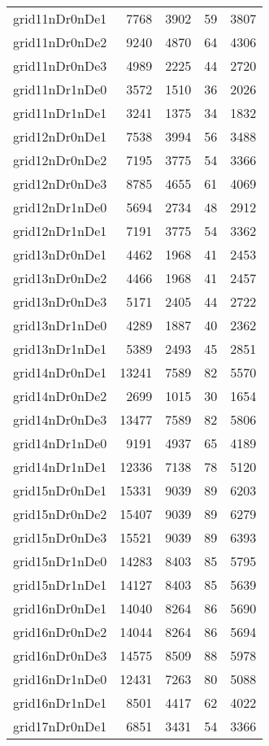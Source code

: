 \documentclass[../../../thesis.tex]{subfiles}
\begin{document}
\begin{longtable}{lrrrr}
grid11nDr0nDe1 & 7768 & 3902 & 59 & 3807 \\
grid11nDr0nDe2 & 9240 & 4870 & 64 & 4306 \\
grid11nDr0nDe3 & 4989 & 2225 & 44 & 2720 \\
grid11nDr1nDe0 & 3572 & 1510 & 36 & 2026 \\
grid11nDr1nDe1 & 3241 & 1375 & 34 & 1832 \\
grid12nDr0nDe1 & 7538 & 3994 & 56 & 3488 \\
grid12nDr0nDe2 & 7195 & 3775 & 54 & 3366 \\
grid12nDr0nDe3 & 8785 & 4655 & 61 & 4069 \\
grid12nDr1nDe0 & 5694 & 2734 & 48 & 2912 \\
grid12nDr1nDe1 & 7191 & 3775 & 54 & 3362 \\
grid13nDr0nDe1 & 4462 & 1968 & 41 & 2453 \\
grid13nDr0nDe2 & 4466 & 1968 & 41 & 2457 \\
grid13nDr0nDe3 & 5171 & 2405 & 44 & 2722 \\
grid13nDr1nDe0 & 4289 & 1887 & 40 & 2362 \\
grid13nDr1nDe1 & 5389 & 2493 & 45 & 2851 \\
grid14nDr0nDe1 & 13241 & 7589 & 82 & 5570 \\
grid14nDr0nDe2 & 2699 & 1015 & 30 & 1654 \\
grid14nDr0nDe3 & 13477 & 7589 & 82 & 5806 \\
grid14nDr1nDe0 & 9191 & 4937 & 65 & 4189 \\
grid14nDr1nDe1 & 12336 & 7138 & 78 & 5120 \\
grid15nDr0nDe1 & 15331 & 9039 & 89 & 6203 \\
grid15nDr0nDe2 & 15407 & 9039 & 89 & 6279 \\
grid15nDr0nDe3 & 15521 & 9039 & 89 & 6393 \\
grid15nDr1nDe0 & 14283 & 8403 & 85 & 5795 \\
grid15nDr1nDe1 & 14127 & 8403 & 85 & 5639 \\
grid16nDr0nDe1 & 14040 & 8264 & 86 & 5690 \\
grid16nDr0nDe2 & 14044 & 8264 & 86 & 5694 \\
grid16nDr0nDe3 & 14575 & 8509 & 88 & 5978 \\
grid16nDr1nDe0 & 12431 & 7263 & 80 & 5088 \\
grid16nDr1nDe1 & 8501 & 4417 & 62 & 4022 \\
grid17nDr0nDe1 & 6851 & 3431 & 54 & 3366 \\

\end{longtable}
\end{document}
